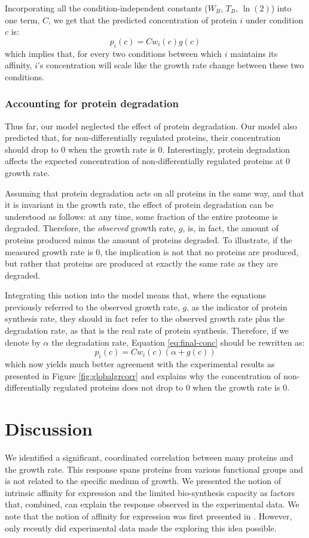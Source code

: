 \documentclass[notitlepage]{article}
\begin{document}
Incorporating all the condition-independent constants ($W_B$, $T_B$, $\ln(2)$) into one term, $C$, we get that the predicted concentration of protein $i$ under condition $c$ is:
\begin{equation}
  \label{eq:final-conc}
  p_i(c)=Cw_i(c)g(c)
\end{equation}
which implies that, for every two conditions between which $i$ maintains its affinity, $i$'s concentration will scale like the growth rate change between these two conditions.

\subsubsection{Accounting for protein degradation}
Thus far, our model neglected the effect of protein degradation.
Our model also predicted that, for non-differentially regulated proteins, their concentration should drop to 0 when the growth rate is 0.
Interestingly, protein degradation affects the expected concentration of non-differentially regulated proteins at 0 growth rate.

Assuming that protein degradation acts on all proteins in the same way, and that it is invariant in the growth rate, the effect of protein degradation can be understood as follows: at any time, some fraction of the entire proteome is degraded.
Therefore, the \emph{observed} growth rate, $g$, is, in fact, the amount of proteins produced minus the amount of proteins degraded.
To illustrate, if the measured growth rate is 0, the implication is not that no proteins are produced, but rather that proteins are produced at exactly the same rate as they are degraded.

Integrating this notion into the model means that, where the equations previously referred to the observed growth rate, $g$, as the indicator of protein synthesis rate, they should in fact refer to the observed growth rate plus the degradation rate, as that is the real rate of protein synthesis.
Therefore, if we denote by $\alpha$ the degradation rate, Equation \ref{eq:final-conc} should be rewritten as:
\begin{equation}
  \label{eq:final-conc-deg}
  p_i(c)=Cw_i(c)(\alpha+g(c))
\end{equation}
which now yields much better agreement with the experimental results as presented in Figure \ref{fig:globalgrcorr} and explains why the concentration of non-differentially regulated proteins does not drop to 0 when the growth rate is 0.
\section{Discussion}
We identified a significant, coordinated correlation between many proteins and the growth rate.
This response spans proteins from various functional groups and is not related to the specific medium of growth.
We presented the notion of intrinsic affinity for expression and the limited bio-synthesis capacity as factors that, combined, can explain the response observed in the experimental data.
We note that the notion of affinity for expression was first presented in \parencite{Maaloe1969}.
However, only recently did experimental data made the exploring this idea possible.
\end{document}

